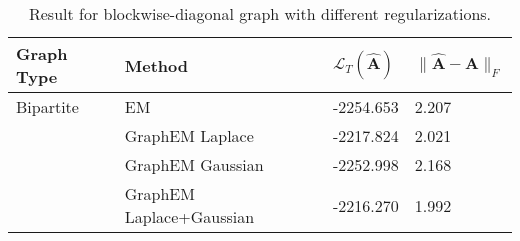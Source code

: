 \begin{table}[tb]
\caption{Result for blockwise-diagonal graph with different regularizations.}
\label{tab: prior results for block-diag}
\begin{tabular}{llll}
\toprule
\textbf{Graph Type} & \textbf{Method} & \textbf{$\mathcal{L}_T(\widehat{\mathbf{A}})$} & \textbf{$\| \widehat{\mathbf{A}} - \mathbf{A} \|_F$} \\
\midrule
Bipartite & EM & -2254.653 & 2.207 \\
 & GraphEM Laplace & -2217.824 & 2.021 \\
 & GraphEM Gaussian & -2252.998 & 2.168 \\
 & GraphEM Laplace+Gaussian & -2216.270 & 1.992 \\
\bottomrule
\end{tabular}
\end{table}
